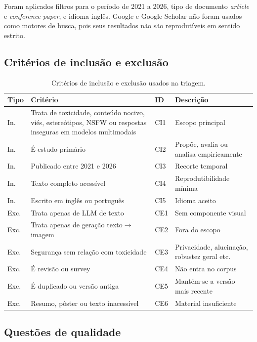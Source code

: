 \documentclass[12pt]{article}
\begin{document}
Foram aplicados filtros para o período de 2021 a 2026, tipo de documento \textit{article} e \textit{conference paper}, e idioma inglês. Google e Google Scholar não foram usados como motores de busca, pois seus resultados não são reprodutíveis em sentido estrito.

\subsection{Critérios de inclusão e exclusão}

\begin{table}[ht]
\centering
\small
\begin{tabular}{p{1.0cm}p{6.9cm}p{1.0cm}p{5.0cm}}
\hline
{\bfseries Tipo} & {\bfseries Critério} & {\bfseries ID} & {\bfseries Descrição} \\
\hline
In. & Trata de toxicidade, conteúdo nocivo, viés, estereótipos, NSFW ou respostas inseguras em modelos multimodais & CI1 & Escopo principal \\
In. & É estudo primário & CI2 & Propõe, avalia ou analisa empiricamente \\
In. & Publicado entre 2021 e 2026 & CI3 & Recorte temporal \\
In. & Texto completo acessível & CI4 & Reprodutibilidade mínima \\
In. & Escrito em inglês ou português & CI5 & Idioma aceito \\
\hline
Exc. & Trata apenas de LLM de texto & CE1 & Sem componente visual \\
Exc. & Trata apenas de geração texto\(\rightarrow\)imagem & CE2 & Fora do escopo \\
Exc. & Segurança sem relação com toxicidade & CE3 & Privacidade, alucinação, robustez geral etc. \\
Exc. & É revisão ou survey & CE4 & Não entra no corpus \\
Exc. & É duplicado ou versão antiga & CE5 & Mantém-se a versão mais recente \\
Exc. & Resumo, pôster ou texto inacessível & CE6 & Material insuficiente \\
\hline
\end{tabular}
\caption{Critérios de inclusão e exclusão usados na triagem.}
\label{tab:criterios}
\end{table}

\subsection{Questões de qualidade}
\end{document}
